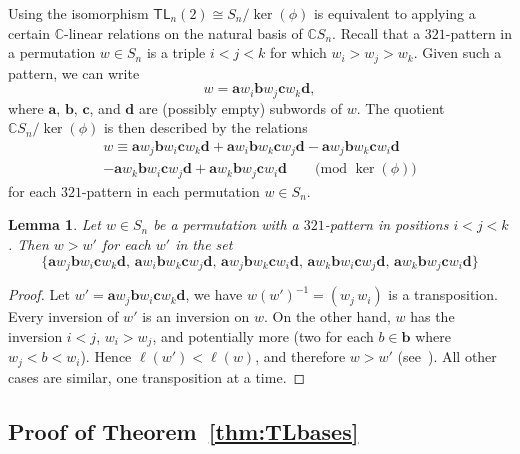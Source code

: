 \documentclass[12pt]{amsart}
\newtheorem{lem}[equation]{Lemma}
\theoremstyle{definition}
\theoremstyle{remark}
\numberwithin{equation}{section}
\newcommand{\CC}{\mathbb{C}}
\newcommand{\TL}{\mathsf{TL}}
\begin{document}
Using the isomorphism $\TL_{n}(2)\cong S_n/\ker(\phi)$ is equivalent to applying a certain $\CC$-linear relations on the natural basis of $\CC S_{n}$.  
Recall that a $321$-pattern in a permutation $w \in S_{n}$ is a triple $i < j < k$ for which $w_{i} > w_{j} > w_{k}$.  Given such a pattern, we can write
\[
w = \mathbf{a}w_{i}\mathbf{b}w_{j}\mathbf{c}w_{k}\mathbf{d},
\]
where $\mathbf{a}$, $\mathbf{b}$, $\mathbf{c}$, and $\mathbf{d}$ are (possibly empty) subwords of $w$.  The quotient $\CC S_{n} / \ker(\phi)$ is then described by the relations
\begin{multline}
\label{eq:321relation}
w \equiv \mathbf{a}w_{j}\mathbf{b}w_{i}\mathbf{c}w_{k}\mathbf{d} + \mathbf{a}w_{i}\mathbf{b}w_{k}\mathbf{c}w_{j}\mathbf{d} - \mathbf{a}w_{j}\mathbf{b}w_{k}\mathbf{c}w_{i}\mathbf{d} \\
- \mathbf{a}w_{k}\mathbf{b}w_{i}\mathbf{c}w_{j}\mathbf{d} + \mathbf{a}w_{k}\mathbf{b}w_{j}\mathbf{c}w_{i}\mathbf{d}  \qquad \text{(mod $\ker(\phi)$)}
\end{multline}
for each $321$-pattern in each permutation $w \in S_{n}$.

\begin{lem}
\label{lem:321reducebruhat}
Let $w \in S_{n}$ be a permutation with a $321$-pattern in positions $i < j < k$.  Then $w > w'$ for each $w'$ in the set
\[
\{
\mathbf{a}w_{j}\mathbf{b}w_{i}\mathbf{c}w_{k}\mathbf{d},  \,
\mathbf{a}w_{i}\mathbf{b}w_{k}\mathbf{c}w_{j}\mathbf{d}, \,
\mathbf{a}w_{j}\mathbf{b}w_{k}\mathbf{c}w_{i}\mathbf{d}, \,
\mathbf{a}w_{k}\mathbf{b}w_{i}\mathbf{c}w_{j}\mathbf{d}, \,
\mathbf{a}w_{k}\mathbf{b}w_{j}\mathbf{c}w_{i}\mathbf{d}
\}
\]
\end{lem}
\begin{proof}
Let $w'=\mathbf{a}w_{j}\mathbf{b}w_{i}\mathbf{c}w_{k}\mathbf{d}$, we have $w(w')^{-1}= (w_j\,w_i)$ is a transposition. 
Every inversion of $w'$ is an inversion on $w$. On the other hand, $w$ has the inversion $i<j$, $w_i>w_j$, and potentially more (two for each $b\in \mathbf{b}$ where $w_j<b<w_i$).
Hence $\ell(w')<\ell(w)$, and therefore $w>w'$ (see~\cite[Chapter 2]{BjornerBrenti}). All other cases are similar, one transposition at a time.
\end{proof}


\subsection{Proof of Theorem~\ref{thm:TLbases}}
\end{document}
